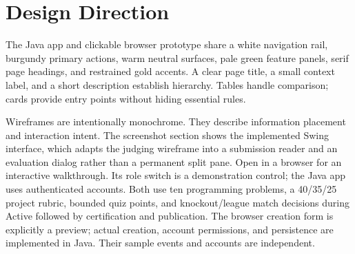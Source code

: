 \documentclass[12pt]{article}
\begin{document}
\section{Design Direction}
The Java app and clickable browser prototype share a white navigation rail, burgundy primary actions, warm neutral surfaces, pale green feature panels, serif page headings, and restrained gold accents. A clear page title, a small context label, and a short description establish hierarchy. Tables handle comparison; cards provide entry points without hiding essential rules.

Wireframes are intentionally monochrome. They describe information placement and interaction intent. The screenshot section shows the implemented Swing interface, which adapts the judging wireframe into a submission reader and an evaluation dialog rather than a permanent split pane.
Open  in a browser for an interactive walkthrough. Its role switch is a demonstration control; the Java app uses authenticated accounts. Both use ten programming problems, a 40/35/25 project rubric, bounded quiz points, and knockout/league match decisions during Active followed by certification and publication. The browser creation form is explicitly a preview; actual creation, account permissions, and persistence are implemented in Java. Their sample events and accounts are independent.
\end{document}
